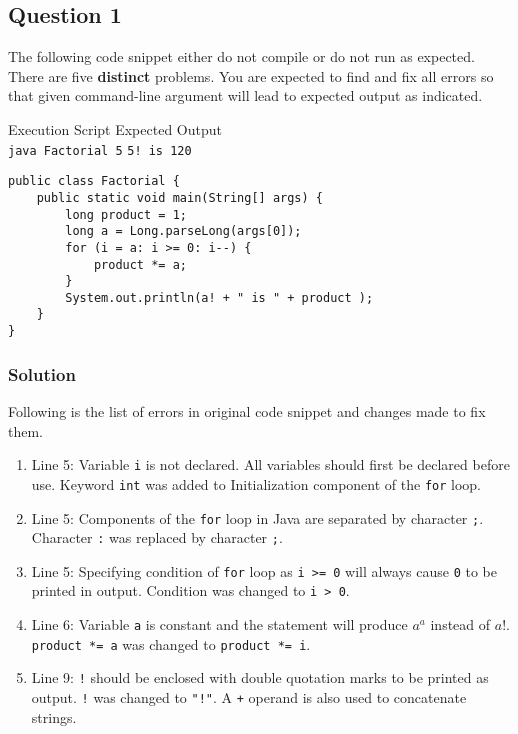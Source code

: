 \subsection*{Question 1}
The following code snippet either do not compile or do not run as expected. There are five \textbf{distinct} problems. You are expected to find and fix all errors so that given command-line argument will lead to expected output as indicated.

\lstset{language=java, tabsize=2}
Execution Script \hfill Expected Output\\
\texttt{java Factorial 5} \hfill \texttt{5! is 120}
\begin{lstlisting}
public class Factorial {
	public static void main(String[] args) {
		long product = 1;
		long a = Long.parseLong(args[0]);
		for (i = a: i >= 0: i--) {
			product *= a;
		}
		System.out.println(a! + " is " + product );
	}
}
\end{lstlisting}

\subsubsection*{Solution}

Following is the list of errors in original code snippet and changes made to fix them.

\begin{enumerate}[label=\arabic*.]
\item Line 5: Variable \texttt{i} is not declared. All variables should first be declared before use. Keyword \texttt{int} was added to Initialization component of the \texttt{for} loop.
\item Line 5: Components of the \texttt{for} loop in Java are separated by character \texttt{;}. Character \texttt{:} was replaced by character \texttt{;}.
\item Line 5: Specifying condition of \texttt{for} loop as \texttt{i >= 0} will always cause \texttt{0} to be printed in output. Condition was changed to \texttt{i > 0}.
\item Line 6: Variable \texttt{a} is constant and the statement will produce $a^a$ instead of $a!$. \texttt{product *= a} was changed to \texttt{product *= i}.
\item Line 9: \texttt{!} should be enclosed with double quotation marks to be printed as output. \texttt{!} was changed to \texttt{"!"}. A \texttt{+} operand is also used to concatenate strings.
\end{enumerate}

